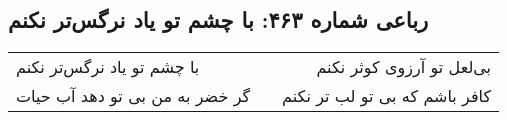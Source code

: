 \begin{center}
\section*{رباعی شماره ۴۶۳: با چشم تو یاد نرگس‌تر نکنم}
\label{sec:sh463}
\begin{longtable}{l p{0.5cm} r}
با چشم تو یاد نرگس‌تر نکنم
&&
بی‌لعل تو آرزوی کوثر نکنم
\\
گر خضر به من بی تو دهد آب حیات
&&
کافر باشم که بی تو لب تر نکنم
\\
\end{longtable}
\end{center}
